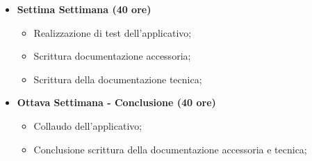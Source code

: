{\begin{itemize}
        \item \textbf{Settima Settimana (40 ore)} 
        \begin{itemize}
            \item Realizzazione di test dell'applicativo;
            \item Scrittura documentazione accessoria;
            \item Scrittura della documentazione tecnica;
        \end{itemize}
        \item \textbf{Ottava Settimana - Conclusione (40 ore)} 
        \begin{itemize}
            \item Collaudo dell'applicativo;
            \item Conclusione scrittura della documentazione accessoria e tecnica;
        \end{itemize}
    \end{itemize}
}

\newcommand{\totaleOre}{320}

\newcommand{\obiettiviObbligatori}{
    \item \underline{\textit{O01}}: Raccolta in tempo reale dei dati di traffico (Logging degli accessi utente, tempi di risposta, ed eventuali errori);

    \item \underline{\textit{O02}}: Individuazione automatica di anomalie con algoritmi rivolti al Machine Learing o AI per identificare:
    \begin{itemize}
        \item Accessi sospetti;
        \item Rallentamenti improvvisi del sistema;
        \item Pattern anomali nei comportamenti utente.
    \end{itemize}
    
    \item \underline{\textit{O03}}: Segnalazione automatica delle anomalie rilevate;
    \item \underline{\textit{O04}}: Scrittura di documentazione tecnica e funzionale.
}

\newcommand{\obiettiviDesiderabili}{
	 \item \underline{\textit{D01}}: primo obiettivo;
}

\newcommand{\obiettiviFacoltativi}{
	 \item \underline{\textit{F01}}: primo obiettivo;
}